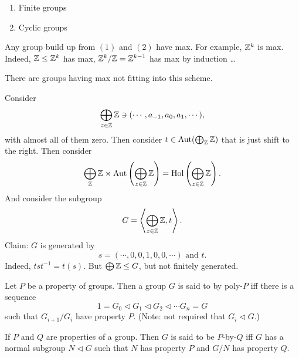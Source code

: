 \begin{eg}
    \begin{enumerate}
        \item Finite groups
        \item Cyclic groups
    \end{enumerate}
    Any group build up from $(1)$ and $(2)$ have max.
    For example,  $ \mathbb{Z}^{k}$ is max.
    Indeed, $ \mathbb{Z} \le \mathbb{Z}^{k}$ has max, $ \mathbb{Z}^{k} / \mathbb{Z} = \mathbb{Z}^{k-1}$ has max by induction \ldots     

    There are groups having max not fitting into this scheme. 
\end{eg}
\begin{eg}
    Consider
    \[
        \bigoplus_{z \in \mathbb{Z}} \mathbb{Z} \ni (\cdots, a_{-1}, a_0, a_1, \cdots)
    ,\] 
    with almost all of them zero.
    Then consider $t \in \operatorname{Aut}(\bigoplus_{\mathbb{Z}} \mathbb{Z})$ that is just shift to the right.
    Then consider
    \[
        \bigoplus_{\mathbb{Z}} \mathbb{Z} \rtimes \operatorname{Aut}\left(\bigoplus_{z \in \mathbb{Z}} \mathbb{Z}\right) = \operatorname{Hol}\left(\bigoplus_{z \in \mathbb{Z}} \mathbb{Z}\right)
    .\] 
    And consider the subgroup
    \[
    G = \left<\bigoplus_{z \in \mathbb{Z}} \mathbb{Z}, t \right>
    .\] 
    Claim: $G$ is generated by
    \[
        s = (\cdots, 0, 0, 1, 0, 0, \cdots) \text{ and } t
    .\] 
    Indeed, $t s t^{-1} = t(s)$.
    But $\bigoplus \mathbb{Z} \le  G$, but not finitely generated.
\end{eg}

\begin{definition}
    Let $P$ be a property of groups.
    Then a group $G$ is said to by poly-$P$ iff there is a sequence
    \[
    1 = G_0 \triangleleft G_1 \triangleleft  G_2 \triangleleft  \cdots G_n = G
    \] 
    such that $G_{i+1} / G_{i}$ have property $P$.
    (Note: not required that $G_i \triangleleft G$.)
\end{definition}

\begin{definition}
    If $P$ and $Q$ are properties of a group.
    Then $G$ is said to be $P$-by-$Q$ iff
    $G$ has a normal subgroup $N \triangleleft  G$ such that
    $N$ has property  $P$ and  $G / N$ has property  $Q$.
\end{definition}
